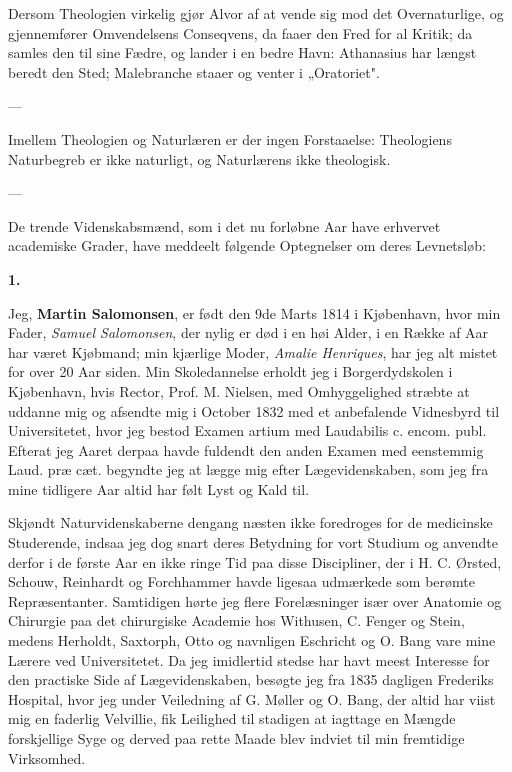 \documentclass[12pt,a4paper]{article}
\newcommand{\opage}[1]{\marginnote{\footnotesize\textit{[#1]}}}
\begin{document}
Dersom Theologien virkelig gjør Alvor af at vende sig mod det Overnaturlige, og
gjennemfører Omvendelsens Conseqvens, da faaer den Fred for al Kritik; da samles
den til sine Fædre, og lander i en bedre Havn: Athanasius har længst beredt den
Sted; Malebranche staaer og venter i „Oratoriet".

\begin{center}---\end{center}

Imellem Theologien og Naturlæren er der ingen Forstaaelse: Theologiens
Naturbegreb er ikke naturligt, og Naturlærens ikke theologisk.

\begin{center}---\end{center}
De trende Videnskabsmænd, som i det nu forløbne Aar have erhvervet academiske
Grader, have meddeelt følgende Optegnelser om deres Levnetsløb:

\begin{center}\textbf{1.}\end{center}

Jeg, \textbf{Martin Salomonsen}, er født den 9de Marts 1814 i Kjøbenhavn, hvor min
Fader, \emph{Samuel Salomonsen}, der nylig er død i en høi Alder, i en Række af
Aar har været Kjøbmand; min kjærlige Moder, \emph{Amalie Henriques}, har jeg alt
mistet for over 20 Aar siden. Min Skoledannelse erholdt jeg i Borgerdydskolen i
Kjøbenhavn, hvis Rector, Prof. M. Nielsen, med Omhyggelighed stræbte at uddanne
mig og afsendte mig i October 1832 med et anbefalende Vidnesbyrd til
Universitetet, hvor jeg bestod Examen artium med Laudabilis c. encom. publ.
Efterat jeg Aaret derpaa havde fuldendt den anden Examen med eenstemmig Laud. præ
cæt. begyndte jeg at lægge mig efter Lægevidenskaben, som jeg fra mine tidligere
Aar altid har følt Lyst og Kald til.

Skjøndt Naturvidenskaberne dengang næsten ikke foredroges for de medicinske
Studerende, indsaa jeg dog snart deres Betydning for vort Studium og anvendte
derfor i de første Aar en ikke ringe Tid paa disse Discipliner, der i H. C.
Ørsted, Schouw, Reinhardt og Forchhammer havde ligesaa udmærkede som berømte
Repræsentanter. Samtidigen hørte jeg flere Forelæsninger især over Anatomie og
Chirurgie paa det chirurgiske Academie hos Withusen, C. Fenger og Stein, medens
Herholdt, Saxtorph, Otto og navnligen Eschricht og O. Bang vare mine Lærere ved
Universitetet. Da jeg
\opage{39} imidlertid stedse har havt meest Interesse for den practiske Side af
Lægevidenskaben, besøgte jeg fra 1835 dagligen Frederiks Hospital, hvor jeg under
Veiledning af G. Møller og O. Bang, der altid har viist mig en faderlig Velvillie,
fik Leilighed til stadigen at iagttage en Mængde forskjellige Syge og derved paa
rette Maade blev indviet til min fremtidige Virksomhed.
\end{document}
